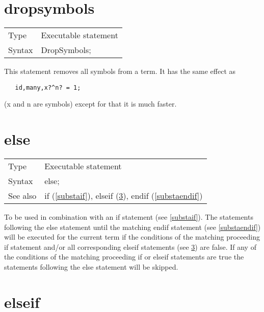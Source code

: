 
\section{dropsymbols}
\label{substadropsymbols}

\noindent \begin{tabular}{ll}
Type & Executable statement\\
Syntax & DropSymbols;
\end{tabular} \vspace{4mm}

\noindent This statement removes all symbols from a term. 
It has the same effect as
\begin{verbatim}
   id,many,x?^n? = 1;
\end{verbatim}
(x and n are symbols) except for that it is much faster.
\vspace{10mm}


\section{else}
\label{substaelse}

\noindent \begin{tabular}{ll}
Type & Executable statement\\
Syntax & else;
\\ See also & if (\ref{substaif}),
              elseif (\ref{substaelseif}),
              endif (\ref{substaendif})
\end{tabular} \vspace{4mm}

\noindent To be used in combination with an if statement (see 
\ref{substaif}). The statements following the
else statement until the matching 
endif 
statement (see \ref{substaendif}) will be executed for the current term if 
the conditions of the matching proceeding if 
statement and/or all corresponding elseif statements (see 
\ref{substaelseif}) are false. If any of the conditions of the matching 
proceeding if or elseif statements are true the statements following the 
else statement will be skipped. \vspace{10mm}

 
\section{elseif}
\label{substaelseif}


